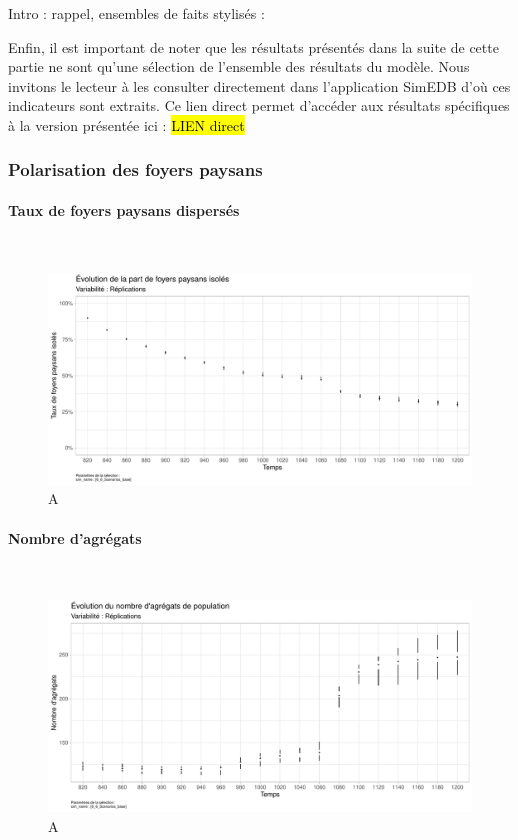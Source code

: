 Intro : rappel,  ensembles de faits stylisés : 


Enfin, il est important de noter que les résultats présentés dans la suite de cette partie ne sont qu'une sélection de l'ensemble des résultats du modèle.
Nous invitons le lecteur à les consulter directement dans l'application SimEDB d'où ces indicateurs sont extraits.
Ce lien direct permet d'accéder aux résultats spécifiques à la version présentée ici : \hl{LIEN direct}



\subsubsection{Polarisation des foyers paysans}

\paragraph{Taux de foyers paysans dispersés}~\\

\begin{figure}[H]
	\centering
	\includegraphics[width=\linewidth]{img/results_6_6/FP_Concentration_Haut.pdf}
	\caption{A}
	\label{}
\end{figure}

\paragraph{Nombre d’agrégats}~\\

\begin{figure}[H]
	\centering
	\includegraphics[width=\linewidth]{img/results_6_6/Agregats_Nb_Haut.pdf}
	\caption{A}
	\label{}
\end{figure}

